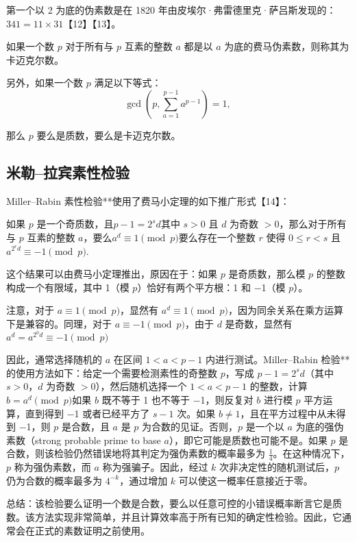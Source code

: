 第一个以 2 为底的伪素数是在 1820 年由皮埃尔·弗雷德里克·萨吕斯发现的：$341 = 11 \times 31$【12】【13】。  

如果一个数 \( p \) 对于所有与 \( p \) 互素的整数 \( a \) 都是以 \( a \) 为底的费马伪素数，则称其为卡迈克尔数。  

另外，如果一个数 \( p \) 满足以下等式：  
$$
\gcd\left(p, \sum_{a=1}^{p-1} a^{p-1}\right) = 1,~
$$

那么 $p$ 要么是质数，要么是卡迈克尔数。
\subsection{米勒–拉宾素性检验}

Miller–Rabin 素性检验**使用了费马小定理的如下推广形式【14】：

如果 $p$ 是一个奇质数，且$p - 1 = 2^s d$其中 $s > 0$ 且 $d$ 为奇数 $>0$，那么对于所有与 $p$ 互素的整数 $a$，要么$a^d \equiv 1 \pmod{p}$要么存在一个整数 $r$ 使得 $0 \le r < s$ 且$a^{2^r d} \equiv -1 \pmod{p}$.

这个结果可以由费马小定理推出，原因在于：如果 $p$ 是奇质数，那么模 $p$ 的整数构成一个有限域，其中 1（模 $p$）恰好有两个平方根：1 和 −1（模 $p$）。

注意，对于 $a \equiv 1 \pmod{p}$，显然有 $a^d \equiv 1 \pmod{p}$，因为同余关系在乘方运算下是兼容的。同理，对于 $a \equiv -1 \pmod{p}$，由于 $d$ 是奇数，显然有$a^d = a^{2^0 d} \equiv -1 \pmod{p}$

因此，通常选择随机的 $a$ 在区间 $1 < a < p - 1$ 内进行测试。Miller–Rabin 检验**的使用方法如下：给定一个需要检测素性的奇整数 $p$，写成 $p - 1 = 2^s d$（其中 $s > 0$，$d$ 为奇数 $> 0$），然后随机选择一个 $1 < a < p - 1$ 的整数，计算$b = a^d \pmod{p}$如果 $b$ 既不等于 1 也不等于 −1，则反复对 $b$ 进行模 $p$ 平方运算，直到得到 −1 或者已经平方了 $s - 1$ 次。如果 $b \neq 1$，且在平方过程中从未得到 −1，则 $p$ 是合数，且 $a$ 是 $p$ 为合数的见证。否则，$p$ 是一个以 $a$ 为底的强伪素数（strong probable prime to base $a$），即它可能是质数也可能不是。如果 $p$ 是合数，则该检验仍然错误地将其判定为强伪素数的概率最多为 $\frac14$。在这种情况下，$p$ 称为强伪素数，而 $a$ 称为强骗子。因此，经过 $k$ 次非决定性的随机测试后，$p$ 仍为合数的概率最多为 $4^{-k}$，通过增加 $k$ 可以使这一概率任意接近于零。

总结：该检验要么证明一个数是合数，要么以任意可控的小错误概率断言它是质数。该方法实现非常简单，并且计算效率高于所有已知的确定性检验。因此，它通常会在正式的素数证明之前使用。
